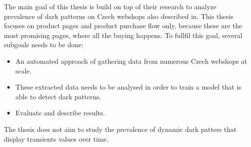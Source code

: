 
The main goal of this thesis is build on top of their research to analyze prevalence of dark patterns on Czech webshops also described in\cite{dark-patterns-at-scale}. This thesis focuses on product pages and product purchase flow only, because these are the most promising pages, where all the buying happens. To fullfil this goal, several subgoals needs to be done:
\begin{itemize}
    \item An automated approach of gathering data from numerous Czech webshops at scale.
    \item These extracted data needs to be analysed in order to train a model that is able to detect dark patterns.
    \item Evaluate and describe results.
\end{itemize}

The thesis does not aim to study the prevalence of dynamic dark patters that display transients values over time.